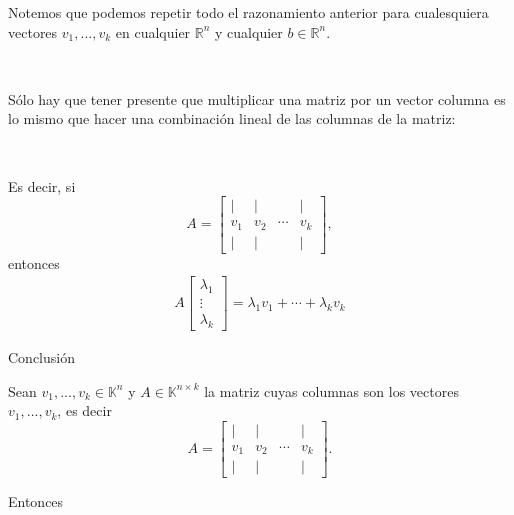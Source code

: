 \documentclass{beamer} %
\newcommand{\R}{\mathbb R}
\newcommand{\K}{\mathbb K}
\begin{document}
    \begin{frame}
    Notemos que podemos repetir todo el razonamiento anterior para cualesquiera vectores $v_1, ..., v_k$ en cualquier $\R^n$ y cualquier $b\in\R^n$.\pause
    
    \
    
    Sólo hay que tener presente que multiplicar una matriz por un vector columna es lo mismo que hacer una combinación lineal de las columnas de la matriz:\pause
    
    \
    
    Es decir, si
    $$
    A=\left[
    \begin{array}{cccc}
    \mid& \mid& &\mid\\
    v_1 & v_2 & \cdots &v_k\\
    \mid& \mid& &\mid
    \end{array}
    \right]
    ,$$ 
    entonces
    \begin{align*}
    A\left[
    \begin{array}{c}
    \lambda_1\\\vdots\\\lambda_k
    \end{array}
    \right]=
    \lambda_1v_1+\cdots+\lambda_kv_k
    \end{align*}
    \end{frame}
    
    \begin{frame}
    
    \begin{block}{Conclusión}
        
        Sean $v_1, ..., v_k\in\K^n$ y $A\in\K^{n\times k}$ la matriz cuyas  columnas son los vectores $v_1, ..., v_k$, es decir
    $$
    A=\left[
    \begin{array}{cccc}
    \mid& \mid& &\mid\\
    v_1 & v_2 & \cdots &v_k\\
    \mid& \mid& &\mid
    \end{array}
    \right]
    .$$\pause
    
    Entonces
\end{block}
    \end{frame}
    
\end{document}

